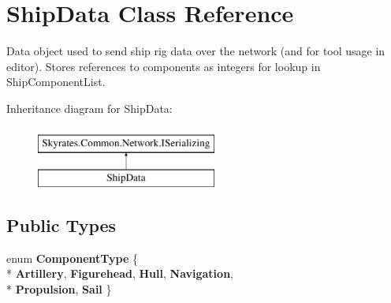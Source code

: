 \hypertarget{class_ship_data}{\section{Ship\-Data Class Reference}
\label{class_ship_data}
}


Data object used to send ship rig data over the network (and for tool usage in editor). Stores references to components as integers for lookup in Ship\-Component\-List.  


Inheritance diagram for Ship\-Data\-:\begin{figure}[H]
\begin{center}
\leavevmode
\includegraphics[height=2.000000cm]{class_ship_data}
\end{center}
\end{figure}
\subsection*{Public Types}
\begin{DoxyCompactItemize}
\item 
enum {\bfseries Component\-Type} \{ \\*
{\bfseries Artillery}, 
{\bfseries Figurehead}, 
{\bfseries Hull}, 
{\bfseries Navigation}, 
\\*
{\bfseries Propulsion}, 
{\bfseries Sail}
 \}
\end{DoxyCompactItemize}
